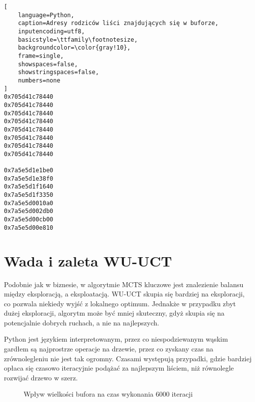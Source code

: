 \begin{lstlisting}[
    language=Python,
    caption=Adresy rodziców liści znajdujących się w buforze,
    inputencoding=utf8,
    basicstyle=\ttfamily\footnotesize,
    backgroundcolor=\color{gray!10},
    frame=single,
    showspaces=false,
    showstringspaces=false,
    numbers=none
]
0x705d41c78440
0x705d41c78440
0x705d41c78440
0x705d41c78440
0x705d41c78440
0x705d41c78440
0x705d41c78440
0x705d41c78440

0x7a5e5d1e1be0
0x7a5e5d1e38f0
0x7a5e5d1f1640
0x7a5e5d1f3350
0x7a5e5d0010a0
0x7a5e5d002db0
0x7a5e5d00cb00
0x7a5e5d00e810
\end{lstlisting}

\section*{Wada i zaleta WU-UCT}
Podobnie jak w biznesie, w algorytmie MCTS kluczowe jest znalezienie balansu między eksploracją, a eksploatacją. WU-UCT skupia się bardziej na eksploracji, co pozwala niekiedy wyjść z lokalnego optimum. Jednakże w przypadku zbyt dużej eksploracji, algorytm może być mniej skuteczny, gdyż skupia się na potencjalnie dobrych ruchach, a nie na najlepszych. 

Python jest językiem interpretowanym, przez co niespodziewanym wąskim gardłem są najprostrze operacje na drzewie, przez co zyskany czas na zrównolegleniu nie jest tak ogromny. Czasami występują przypadki, gdzie bardziej opłaca się czasowo iteracyjnie podążać za najlepszym liściem, niż równolegle rozwijać drzewo w szerz.

\begin{figure}[!h]
\centering
{}
\caption{Wpływ wielkości bufora na czas wykonania 6000 iteracji}
\label{fig:metric-iteracje}
\end{figure}

